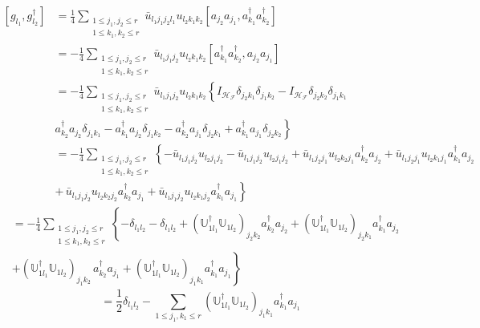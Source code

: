 \documentclass[aps,preprint]{revtex4}%
\begin{document}
\begin{align}
\left[  g_{l_{1}}^{{}},g_{l_{2}}^{\dagger}\right]   &  =\frac{1}{4}%
\sum_{\substack{1\leq j_{1},j_{2}\leq r\\1\leq k_{1},k_{2}\leq r}}\bar
{u}_{l_{1}j_{1}j_{2}l_{1}}u_{l_{2}k_{1}k_{2}}\left[  a_{j_{2}}a_{j_{1}%
},a_{k_{1}}^{\dagger}a_{k_{2}}^{\dagger}\right]  \\
&  =-\frac{1}{4}\sum_{\substack{1\leq j_{1},j_{2}\leq r\\1\leq k_{1},k_{2}\leq
r}}\bar{u}_{l_{1}j_{1}j_{2}}u_{l_{2}k_{1}k_{2}}\left[  a_{k_{1}}^{\dagger
}a_{k_{2}}^{\dagger},a_{j_{2}}a_{j_{1}}\right]  \\
&  =-\frac{1}{4}\sum_{\substack{1\leq j_{1},j_{2}\leq r\\1\leq k_{1},k_{2}\leq
r}}\bar{u}_{l_{1}j_{1}j_{2}}u_{l_{2}k_{1}k_{2}}\left\{  I_{\mathcal{H}%
_{\mathcal{F}}}\delta_{j_{2}k_{1}}\delta_{j_{1}k_{2}}-I_{\mathcal{H}%
_{\mathcal{F}}}\delta_{j_{2}k_{2}}\delta_{j_{1}k_{1}}\right.  \\
&  \left.  a_{k_{2}}^{\dagger}a_{j_{2}}\delta_{j_{1}k_{1}}-a_{k_{1}}^{\dagger
}a_{j_{2}}\delta_{j_{1}k_{2}}-a_{k_{2}}^{\dagger}a_{j_{1}}\delta_{j_{2}k_{1}%
}+a_{k_{1}}^{\dagger}a_{j_{1}}\delta_{j_{2}k_{2}}\right\}  \\
&  =-\frac{1}{4}\sum_{\substack{1\leq j_{1},j_{2}\leq r\\1\leq k_{1},k_{2}\leq
r}}\left\{  -\bar{u}_{l_{1}j_{1}j_{2}}u_{l_{2}j_{1}j_{2}}-\bar{u}_{l_{1}%
j_{1}j_{2}}u_{l_{2}j_{1}j_{2}}+\bar{u}_{l_{1}j_{2}j_{1}}u_{l_{2}k_{2}j_{1}%
}a_{k_{2}}^{\dagger}a_{j_{2}}+\bar{u}_{l_{1}j_{2}j_{1}}u_{l_{2}k_{1}j_{1}%
}a_{k_{1}}^{\dagger}a_{j_{2}}\right.  \\
&  \left.  +\,\bar{u}_{l_{1}j_{1}j_{2}}u_{l_{2}k_{2}j_{2}}a_{k_{2}}^{\dagger
}a_{j_{1}}+\bar{u}_{l_{1}j_{1}j_{2}}u_{l_{2}k_{1}j_{2}}a_{k_{1}}^{\dagger
}a_{j_{1}}\right\}
\end{align}%
\begin{align}
&  =-\frac{1}{4}\sum_{\substack{1\leq j_{1},j_{2}\leq r\\1\leq k_{1},k_{2}\leq
r}}\left\{  -\delta_{l_{1}l_{2}}-\delta_{l_{1}l_{2}}+\left(  \mathbb{U}%
_{1l_{1}}^{\dagger}\mathbb{U}_{1l_{2}}\right)  _{j_{2}k_{2}}a_{k_{2}}%
^{\dagger}a_{j_{2}}+\left(  \mathbb{U}_{1l_{1}}^{\dagger}\mathbb{U}_{1l_{2}%
}\right)  _{j_{2}k_{1}}a_{k_{1}}^{\dagger}a_{j_{2}}\right.  \\
&  \left.  +\left(  \mathbb{U}_{1l_{1}}^{\dagger}\mathbb{U}_{1l_{2}}\right)
_{j_{1}k_{2}}\,a_{k_{2}}^{\dagger}a_{j_{1}}+\left(  \mathbb{U}_{1l_{1}%
}^{\dagger}\mathbb{U}_{1l_{2}}\right)  _{j_{1}k_{1}}a_{k_{1}}^{\dagger
}a_{j_{1}}\right\}
\end{align}%
\begin{equation}
=\frac{1}{2}\delta_{l_{1}l_{2}}-\sum_{1\leq j_{1},k_{1}\leq r}\left(
\mathbb{U}_{1l_{1}}^{\dagger}\mathbb{U}_{1l_{2}}\right)  _{j_{1}k_{1}}%
a_{k_{1}}^{\dagger}a_{j_{1}}%
\end{equation}
\end{document}
